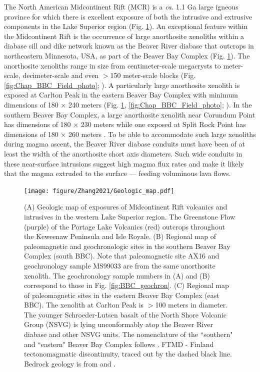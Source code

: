The North American Midcontinent Rift (MCR) is a \textit{ca.} 1.1 Ga large igneous province for which there is excellent exposure of both the intrusive and extrusive components in the Lake Superior region (Fig. \ref{Chap_BBC_Geologic_map}). An exceptional feature within the Midcontinent Rift is the occurrence of large anorthosite xenoliths within a diabase sill and dike network known as the Beaver River diabase that outcrops in northeastern Minnesota, USA, as part of the Beaver Bay Complex (Fig. \ref{Chap_BBC_Geologic_map}). The anorthosite xenoliths range in size from centimeter-scale megacrysts to meter-scale, decimeter-scale and even $>$150 meter-scale blocks (Fig. \ref{fig:Chap_BBC_Field_photo}; \cite{Morrison1983a, Grout1939a}). A particularly large anorthosite xenolith is exposed at Carlton Peak in the eastern Beaver Bay Complex with minimum dimensions of 180 $\times$ 240 meters (Fig. \ref{Chap_BBC_Geologic_map}, \ref{fig:Chap_BBC_Field_photo}; \cite{Boerboom2006b}). In the southern Beaver Bay Complex, a large anorthosite xenolith near Corundum Point has dimensions of 180 $\times$ 230 meters while one exposed at Split Rock Point has dimensions of 180 $\times$ 260 meters \citep{Boerboom2004a}. To be able to accommodate such large xenoliths during magma ascent, the Beaver River diabase conduits must have been of at least the width of the anorthosite short axis diameters. Such wide conduits in these near-surface intrusions suggest high magma flux rates and make it likely that the magma extruded to the surface --- feeding voluminous lava flows.  

\begin{figure}[h!]
\noindent\texttt{[image: figure/Zhang2021/Geologic\_map.pdf]}
\centering
\caption{\footnotesize{(A) Geologic map of exposures of Midcontinent Rift volcanics and intrusives in the western Lake Superior region. The Greenstone Flow (purple) of the Portage Lake Volcanics (red) outcrops throughout the Keweenaw Peninsula and Isle Royale. (B) Regional map of paleomagnetic and geochronologic sites in the southern Beaver Bay Complex (south BBC). Note that paleomagnetic site AX16 and geochronology sample MS99033 are from the same anorthosite xenolith. The geochronology sample numbers in (A) and (B) correspond to those in Fig. \ref{fig:BBC_geochron}. (C) Regional map of paleomagnetic sites in the eastern Beaver Bay Complex (east BBC). The xenolith at Carlton Peak is $>$100 meters in diameter. The younger Schroeder-Lutsen basalt of the North Shore Volcanic Group (NSVG) is lying unconformably atop the Beaver River diabase and other NSVG units. The nomenclature of the ``southern" and ``eastern" Beaver Bay Complex follows \cite{Miller1997a}. FTMD - Finland tectonomagmatic discontinuity, traced out by the dashed black line. Bedrock geology is from \cite{Miller2001a} and \cite{Jirsa2011a}.}}
\label{Chap_BBC_Geologic_map}
\end{figure}

